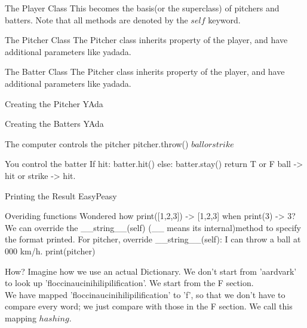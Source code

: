 \documentclass{beamer}
\begin{document}
\begin{frame}{The Player Class}
  This becomes the basis(or the superclass) of pitchers and batters.
  Note that all methods are denoted by the $self$ keyword.
\end{frame}

\begin{frame}{The Pitcher Class}
  The Pitcher class inherits property of the player, and have additional
  parameters like yadada.
\end{frame}

\begin{frame}{The Batter Class}
  The Pitcher class inherits property of the player, and have additional
  parameters like yadada.
\end{frame}

\begin{frame}{Creating the Pitcher}
  YAda
\end{frame}

\begin{frame}{Creating the Batters}
  YAda
\end{frame}

\begin{frame}{The computer controls the pitcher}
  pitcher.throw() $ball or strike$
\end{frame}

\begin{frame}{You control the batter}
  If hit:
    batter.hit()
  else:
    batter.stay()
  return T or F
  ball -> hit or strike -> hit.
\end{frame}

\begin{frame}{Printing the Result}
  EasyPeasy
\end{frame}

\begin{frame}{Overiding functions}
  Wondered how print([1,2,3]) -> [1,2,3] when print(3) -> 3?
  We can override the __string__(self) (__ means its internal)method to specify
  the format printed.
  For pitcher, override __string__(self): I can throw a ball at 000 km/h.
  print(pitcher)
\end{frame}

\begin{frame}{How?}
  Imagine how we use an actual Dictionary. We don't start from 'aardvark' to
  look up 'floccinaucinihilipilification'.
  We start from the F section.\\

  We have mapped 'floccinaucinihilipilification' to 'f', so that we don't have
  to compare every word; we just compare with those in the F section.
  We call this mapping $hashing$.
\end{frame}
\end{document}
